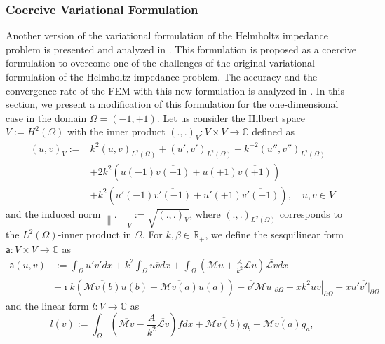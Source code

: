 \subsubsection{Coercive Variational Formulation}\label{sec:coerciveformulation}
Another version of the variational formulation of the Helmholtz impedance problem is presented and analyzed in \cite{moiola2014}. This formulation is proposed as a coercive formulation to overcome one of the challenges of the original variational formulation of the Helmholtz impedance problem. The accuracy and the convergence rate of the FEM with this new formulation is analyzed in \cite{diwan2018}. In this section, we present a modification of this formulation for the one-dimensional case in the domain $\Omega=(-1,+1)$. Let us consider the Hilbert space $V:= H^2(\Omega)$ with the inner product $(.,.)_V : V \times V \to \mathbb{C}$ defined as
\begin{equation}
    \begin{aligned}
        (u, v)_V := & k^2(u,v)_{L^2(\Omega)} + (u',v')_{L^2(\Omega)} + k^{-2}(u'',v'')_{L^2(\Omega)} \\
        & + 2k^2 \left( u(-1)\overline{v(-1)} + u(+1)\overline{v(+1)} \right)\\
        & + k^2 \left( u'(-1)\overline{v'(-1)} + u'(+1)\overline{v'(+1)} \right), \quad u,v \in V
    \end{aligned}
\end{equation}
and the induced norm $\left\| . \right\|_V := \sqrt{(.,.)_V}$, where $(.,.)_{L^2(\Omega)}$ corresponds to the $L^2(\Omega)$-inner product in $\Omega$. For $k, \beta \in \mathbb{R}_{+}$, we define the sesquilinear form $\mathsf{a}: V \times V \to \mathbb{C}$ as
\begin{equation}
    \label{eq:coercivelhs}
    \begin{split}
        \mathsf{a}(u, v) & := \int_{\Omega}{u'\overline{v'}dx} + k^2 \int_{\Omega}{u\overline{v}dx} + \int_{\Omega} \left ( \mathcal{M}u + \frac{A}{k^2}\mathcal{L}u\right )\overline{\mathcal{L}v}dx \\ & - \imath k (\overline{\mathcal{M}v(b)}u(b) + \overline{\mathcal{M}v(a)}u(a)) - \overline{v'}\mathcal{M}u|_{\partial \Omega} - xk^2u\overline{v}|_{\partial \Omega} + xu'\overline{v'}|_{\partial \Omega}
    \end{split}
\end{equation}
and the linear form $l: V \to \mathbb{C}$ as
\begin{equation}
    \label{eq:coerciverhs}
    l(v) := \int_{\Omega}{\left ( \overline{\mathcal{M}v} - \frac{A}{k^2} \overline{\mathcal{L}v} \right )fdx + \overline{\mathcal{M}v(b)}g_b + \overline{\mathcal{M}v(a)}g_a},
\end{equation}
